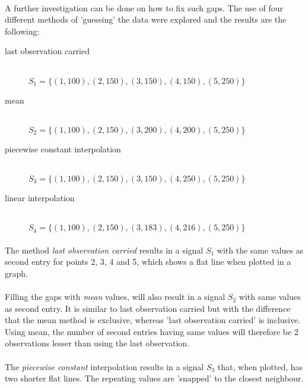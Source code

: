 \paragraph{}
A further investigation can be done on how to fix such gaps. The use of four
different methods of 'guessing' the data were explored and the results are the
following:
\begin{description}
	\item[last observation carried] \hfill \\[1em]
	$S_{1} = \{(1,100), (2,150), (3,150), (4,150), (5,250)\}$

	\item[mean] \hfill \\[1em]
	$S_{2} = \{(1,100), (2,150), (3,200), (4,200), (5,250)\}$
	
	\item[piecewise constant interpolation] \hfill \\[1em]
	$S_{3} = \{(1,100), (2,150), (3,150), (4,250), (5,250)\}$
	
	\item[linear interpolation] \hfill \\[1em]
	$S_{4} = \{(1,100), (2,150), (3,183), (4,216), (5,250)\}$
\end{description}

\paragraph{}
The method \textit{last observation carried} results in a signal $S_{1}$
with the same values as second entry for points 2, 3, 4 and 5, which shows a
flat line when plotted in a graph.

\paragraph{}
Filling the gaps with \textit{mean} values, will also result in a signal
$S_{2}$ with same values as second entry. It is similar to last observation
carried but with the difference that the mean method is exclusive, whereas
'last observation carried' is inclusive. Using mean, the number of second
entries having same values will therefore be 2 observations lesser than using
the last observation.

\paragraph{}
The \textit{piecewise constant} interpolation results in a signal $S_{3}$
that, when plotted, has two shorter flat lines. The repeating values are
'snapped' to the closest neighbour.


